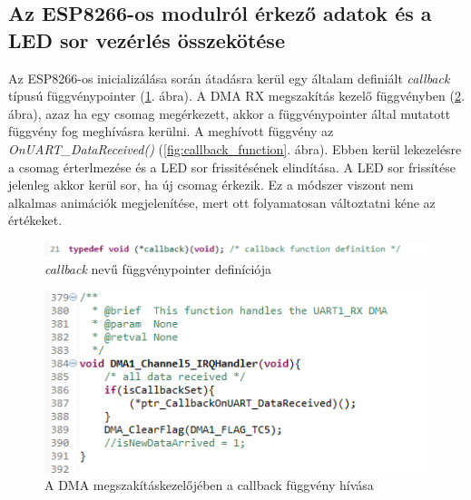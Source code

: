 \documentclass[../main.tex]{subfiles}
\begin{document}
    \subsection{Az ESP8266-os modulról érkező adatok és a LED sor vezérlés összekötése}
        Az ESP8266-os inicializálása során átadásra kerül egy általam definiált \textit{callback} típusú függvénypointer (\ref{fig:callback_typedef}. ábra). A DMA RX megszakítás kezelő függvényben (\ref{fig:callback_call}. ábra), azaz ha egy csomag megérkezett, akkor a függvénypointer által mutatott függvény fog meghívásra kerülni. A meghívott függvény az \textit{OnUART_DataReceived()} (\ref{fig:callback_function}. ábra). Ebben kerül lekezelésre a csomag érterlmezése és a LED sor frissitésének elindítása. A LED sor frissítése jelenleg akkor kerül sor, ha új csomag érkezik. Ez a módszer viszont nem alkalmas animációk megjelenítése, mert ott folyamatosan változtatni kéne az értékeket.
        
        \begin{figure}[h!]
            \centering
                \includegraphics[width=12cm]{mbed_res/callback_typedef}
            \caption{\textit{callback} nevű függvénypointer definíciója}
            \label{fig:callback_typedef}
        \end{figure}
        
        \begin{figure}[h!]
            \centering
                \includegraphics[width=12cm]{mbed_res/callback_dma.png}
            \caption{A DMA megszakításkezelőjében a callback függvény hívása}
            \label{fig:callback_call}
        \end{figure}
        
\end{document}
